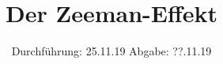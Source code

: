 

\subject{V27}
\title{Der Zeeman-Effekt}
\date{
  Durchführung: 25.11.19
  \hspace{3em}
  Abgabe: ??.11.19
}



\maketitle
\thispagestyle{empty}
\tableofcontents
\newpage




%




\newpage
\printbibliography


